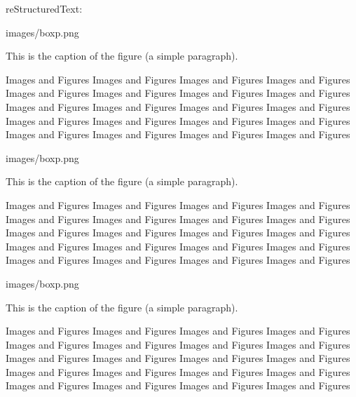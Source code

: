 \documentclass[letterpaper,11pt,english]{sphinxmanual}
\begin{document}
reStructuredText:

\begin{sphinxVerbatim}[commandchars=\\\{\}]
  images/boxp.png
    
    
    
    
    

   This is the caption of the figure (a simple paragraph).

Images and Figures Images and Figures Images and Figures Images and Figures Images and Figures
Images and Figures Images and Figures Images and Figures Images and Figures Images and Figures
Images and Figures Images and Figures Images and Figures Images and Figures Images and Figures
Images and Figures Images and Figures Images and Figures Images and Figures Images and Figures

  images/boxp.png
    
    
    
    
    

   This is the caption of the figure (a simple paragraph).

Images and Figures Images and Figures Images and Figures Images and Figures Images and Figures
Images and Figures Images and Figures Images and Figures Images and Figures Images and Figures
Images and Figures Images and Figures Images and Figures Images and Figures Images and Figures
Images and Figures Images and Figures Images and Figures Images and Figures Images and Figures


  images/boxp.png
    
    
    
    
    

   This is the caption of the figure (a simple paragraph).

Images and Figures Images and Figures Images and Figures Images and Figures Images and Figures
Images and Figures Images and Figures Images and Figures Images and Figures Images and Figures
Images and Figures Images and Figures Images and Figures Images and Figures Images and Figures
Images and Figures Images and Figures Images and Figures Images and Figures Images and Figures
\end{sphinxVerbatim}
\end{document}
